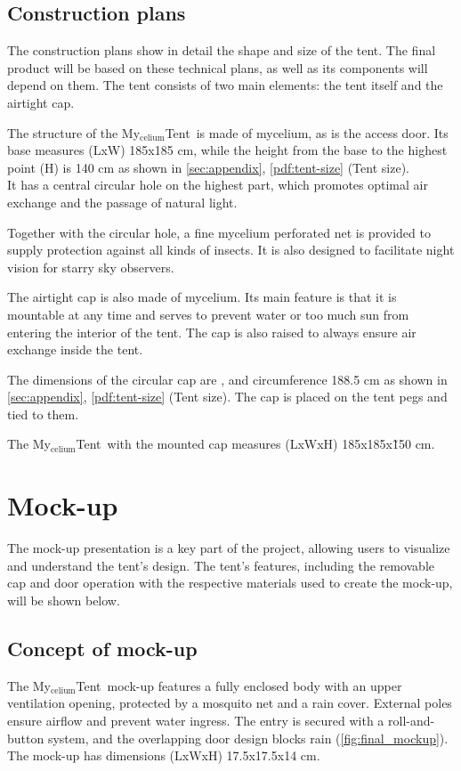 \documentclass{article}
\newcommand{\myc}{My$_{\text{celium}}$Tent}
\begin{document}
\subsection{Construction plans}
The construction plans show in detail the shape and size of the tent. The final product
will be based on these technical plans, as well as its components will depend on them.
The tent consists of two main elements: the tent itself and the airtight cap.

The structure of the \myc\ is made of mycelium, as is the access door.
Its base measures (LxW) 185x185 cm, while the height from the base to the highest point (H)
is 140 cm as shown in \autoref{sec:appendix}, \autoref{pdf:tent-size} (Tent size).\\
It has a central circular hole on the highest part, which promotes optimal air exchange
and the passage of natural light.

Together with the circular hole, a fine mycelium perforated net is provided to supply
protection against all kinds of insects. It is also designed to facilitate night vision for starry
sky observers.

The airtight cap is also made of mycelium. Its main feature is that it is mountable at
any time and serves to prevent water or too much sun from entering the interior of the
tent. The cap is also raised to always ensure air exchange inside the tent.

The dimensions of the circular cap are \diameter 60cm, and circumference 188.5 cm
as shown in \autoref{sec:appendix}, \autoref{pdf:tent-size} (Tent size).
The cap is placed on the tent pegs and tied to them.

The \myc\ with the mounted cap measures (LxWxH) 185x185x\~150 cm.

\section{Mock-up}
The mock-up presentation is a key part of the project, allowing users to visualize and
understand the tent's design. The tent's features, including the removable cap and door
operation with the respective materials used to create the mock-up, will be shown below.

\subsection{Concept of mock-up}
The \myc\ mock-up features a fully enclosed body with an upper ventilation
opening, protected by a mosquito net and a rain cover.
External poles ensure airflow and prevent water ingress. The entry is secured with a
roll-and-button system, and the overlapping door design blocks rain (\autoref{fig:final_mockup}).
The mock-up has dimensions (LxWxH) 17.5x17.5x14 cm.
\end{document}
